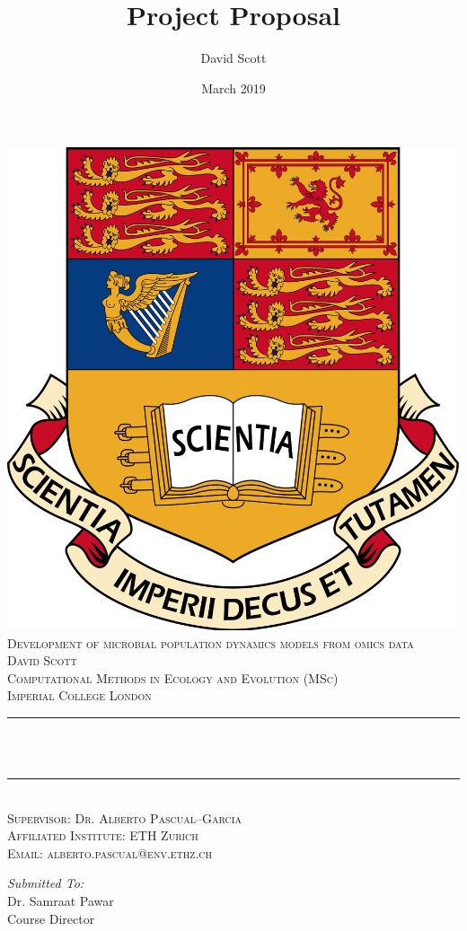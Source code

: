 \documentclass[11pt, onehalfspacing]{article}
\title{Project Proposal}	%
\author{David Scott}			%
\date{March 2019}			    %
\makeatletter
\let\thetitle\@title
\makeatother
\begin{document}
	\begin{titlepage}
	\centering
	\vspace*{0.5 cm}
	\includegraphics[scale = 0.15]{logo2.png}\\[1.0 cm]	%
	\textsc{\LARGE Development of microbial population dynamics models from omics data}\\[1 cm]
	\textsc{\Large David Scott}\\[0.5 cm]
	\textsc{\Large Computational Methods in Ecology and Evolution (MSc)}\\[0.5 cm]				%
	\textsc{\Large Imperial College London}\\[0.5 cm]
	\rule{\linewidth}{0.2 mm} \\[0.4 cm]
	{ \huge \bfseries \thetitle}\\
	\rule{\linewidth}{0.2 mm} \\[0.75 cm]
	\textsc{\Large Supervisor: Dr. Alberto Pascual--Garcia}\\[0.5 cm]	
	\textsc{\Large Affiliated Institute: ETH Zurich}\\[0.5 cm]
	\textsc{\Large Email: alberto.pascual@env.ethz.ch}\\[0.5 cm]		
	\vspace*{2 cm}
	\begin{minipage}{0.4\textwidth}
		\begin{flushleft} \large
			\emph{Submitted To:}\\
			Dr. Samraat Pawar\\
			Course Director\\
		\end{flushleft}
	\end{minipage}~
	\begin{minipage}{0.4\textwidth}
		

\end{minipage}
\end{titlepage}
\end{document}
